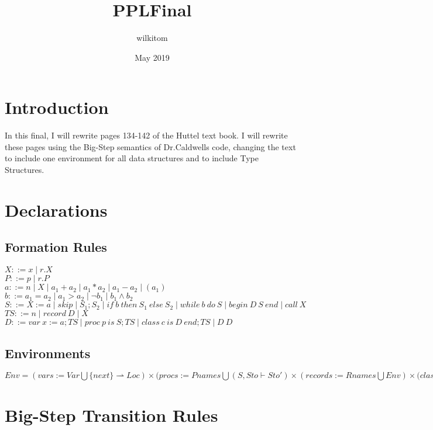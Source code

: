 \documentclass{article}
\title{PPLFinal}
\author{wilkitom }
\date{May 2019}
\begin{document}
\maketitle

\section{Introduction}
In this final, I will rewrite pages 134-142 of the Huttel text book. I will rewrite these pages using the Big-Step semantics of Dr.Caldwells code, changing the text to include one environment for all data structures and to include Type Structures. 

\section{Declarations}
\subsection{Formation Rules}
$X ::= x \mid r.X$\\
$P ::= p \mid r.P$\\
$a ::= n \mid X \mid a_1+a_2 \mid a_1*a_2 \mid a_1-a_2 \mid (a_1)$\\
$b ::= a_1 = a_2 \mid a_1 > a_2 \mid \neg b_1 \mid b_1 \wedge b_2$\\
$S ::= X := a \mid skip \mid S_1 ; S_2 \mid if \: b \: then \: S_1 \: else \: S_2 \mid while \: b \: do \: S \mid begin \: D \: S \: end \mid call \: X$\\
$TS ::= n \mid record \: D \mid X$\\
$D ::= var \: x := a;TS \mid proc \:p\: is\: S;TS \mid class\: c\: is \:D \:end;TS \mid D\: D$

\subsection{Environments}
$Env = (vars := Var \bigcup \{next\} \rightharpoonup Loc) \times (procs := Pnames \bigcup (S, Sto \vdash Sto') \times (records := Rnames\bigcup Env) \times (classes := Cnames \bigcup (TS \vdash TS', Sto \vdash Sto')$

\section{Big-Step Transition Rules}
\end{document}
